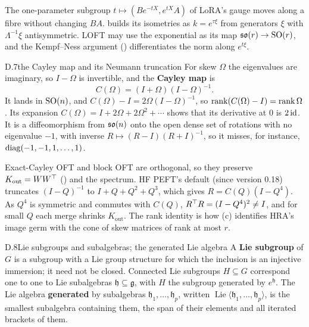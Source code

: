 The one-parameter subgroup $t\mapsto(Be^{-tX},e^{tX}A)$ of LoRA's gauge moves along a fibre without changing $BA$.
 builds its isometries as $k=e^{\tau\xi}$ from generators $\xi$ with $\Lambda^{-1}\xi$
antisymmetric. LOFT may use the exponential as its map $\mathfrak{so}(r)\to\mathrm{SO}(r)$, and the Kempf--Ness argument ()
differentiates the norm along $e^{t\xi}$.


\begin{bgentry}{D.7}{the Cayley map and its Neumann truncation}
For skew $\Omega$ the eigenvalues are imaginary, so $I-\Omega$ is invertible, and the \textbf{Cayley map} is
\[C(\Omega)=(I+\Omega)(I-\Omega)^{-1}.\]
It lands in $\mathrm{SO}(n)$, and $C(\Omega)-I=2\Omega(I-\Omega)^{-1}$, so $\operatorname{rank}(C(\Omega)-I)=\operatorname{rank}\Omega$. Its expansion
$C(\Omega)=I+2\Omega+2\Omega^2+\cdots$ shows that its derivative at $0$ is $2\,\mathrm{id}$. It is a diffeomorphism from
$\mathfrak{so}(n)$ onto the open dense set of rotations with no eigenvalue $-1$, with inverse $R\mapsto(R-I)(R+I)^{-1}$, so it
misses, for instance, $\operatorname{diag}(-1,-1,1,\dots,1)$.
\end{bgentry}

Exact-Cayley OFT and block OFT are orthogonal, so they preserve $K_{\mathrm{out}}=WW^{\top}$ () and the spectrum.
HF PEFT's default (since version 0.18) truncates $(I-Q)^{-1}$ to $I+Q+Q^2+Q^3$, which gives
$R=C(Q)(I-Q^4)$. As $Q^4$ is symmetric and
commutes with $C(Q)$, $R^{\top} R=(I-Q^4)^2\ne I$, and for small $Q$ each merge shrinks $K_{\mathrm{out}}$. The rank identity
is how (c) identifies HRA's image germ with the cone of skew matrices of rank at most $r$.


\begin{bgentry}{D.8}{Lie subgroups and subalgebras; the generated Lie algebra}
A \textbf{Lie subgroup} of $G$ is a subgroup with a Lie group structure for which the inclusion is an injective
immersion; it need not be closed. Connected Lie subgroups $H\subseteq G$ correspond one to one to Lie subalgebras
$\mathfrak h\subseteq\mathfrak g$, with $H$ the subgroup generated by $e^{\mathfrak h}$. The Lie algebra
\textbf{generated} by subalgebras $\mathfrak h_1,\dots,\mathfrak h_p$, written $\operatorname{Lie}\langle\mathfrak
h_1,\dots,\mathfrak h_p\rangle$, is the smallest subalgebra containing them, the span of their elements and all iterated
brackets of them.
\end{bgentry}

